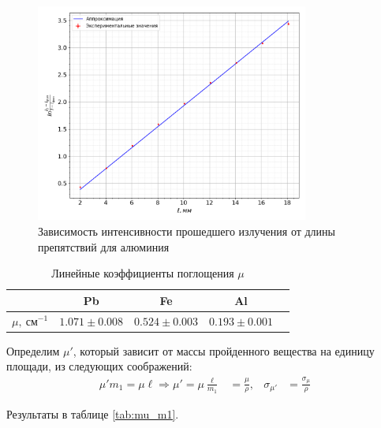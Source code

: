 \documentclass[a4paper, 12pt]{article}
\begin{document}
            \begin{figure}[ht!]
                \begin{center}
                    \includegraphics[width = 0.8\textwidth]{img/Al.png}
                    \caption{Зависимость интенсивности прошедшего излучения от длины препятствий для алюминия}
                    \label{plot:Al}
                \end{center}
            \end{figure}

            \begin{table}[!ht]
                \centering
                \begin{tabular}{|c|c|c|c|c|}
                    \hline

                     & Pb & Fe & Al\\ \hline
                    $\mu,~см^{-1}$ & $1.071 \pm 0.008$ & $0.524 \pm 0.003$ & $0.193 \pm 0.001$\\ \hline

                \end{tabular}
                \caption{Линейные коэффициенты поглощения $\mu$}
                \label{tab:mu}
            \end{table}


            Определим $\mu'$, который зависит от массы пройденного вещества на единицу площади, из следующих соображений:
            \begin{align*}
                \mu' m_1 = \mu \ell \Rightarrow \mu' = \mu \frac{\ell}{m_1} &= \frac{\mu}{\rho}, & \sigma_{\mu'} &= \frac{\sigma_{\mu}}{\rho}
            \end{align*}

            Результаты в таблице \ref{tab:mu_m1}.
\end{document}
